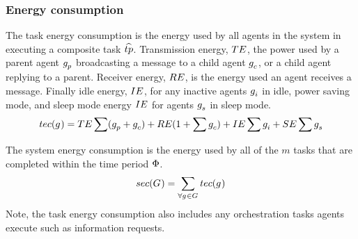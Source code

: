 \subsubsection{Energy consumption}
\begin{definition}
	The task energy consumption is the energy used by all agents in the system in executing a composite task $\varCompositeTask{}{}$. Transmission energy, $TE$, the power used by a parent agent $g_{p}^{}$ broadcasting a message to a child agent $g_{c}^{}$, or a child agent replying to a parent. Receiver energy, $RE$, is the energy used an agent receives a message. Finally idle energy, $IE$, for any inactive agents $g_{i}^{}$ in idle, power saving mode, and sleep mode energy $IE$ for agents $g_{s}^{}$ in sleep mode.
	\begin{equation}
		\functionTaskEnergy{}{} 
		= \varTransmissionEnergy{}{} \sum (\varParentAgent{}{} + \varChildAgent{}{})
		+ \varReceiverEnergy{}{} (1 + \sum \varChildAgent{}{})
		+ \varIdleEnergy{}{} \sum \varIdleAgent{}{}
		+ \varSleepEnergy{}{} \sum \varSleepAgent{}{}
	\end{equation}
\end{definition}



\begin{definition}
	The system energy consumption is the energy used by all of the $m$ tasks that are completed within the time period $\Phi$.
	\begin{equation}
		\functionSystemEnergyConsumption{}{} 
		= \sum_{\forall \varAgent{}{} \in \setAgents{}{}}  \functionTaskEnergy{}{}
	\end{equation}
	Note, the task energy consumption also includes any orchestration tasks agents execute such as information requests.
\end{definition}

